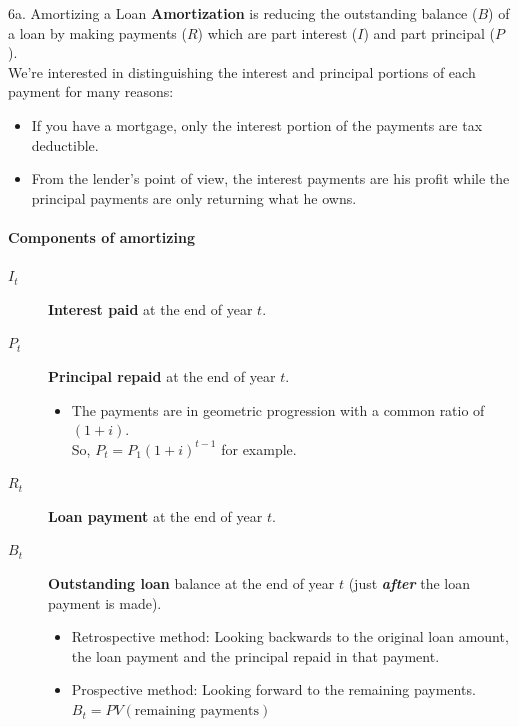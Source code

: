 \begin{CHPT_SUMM_AUTO}[label = {L.-6a}]{6a. Amortizing a Loan}
\textbf{Amortization} is reducing the outstanding balance ($B$) of a loan by making payments ($R$) which are part interest ($I$) and part principal ($P$).\\

We're interested in distinguishing the interest and principal portions of each payment for many reasons:
\begin{itemize}[leftmargin = *]
	\item	If you have a mortgage, only the interest portion of the payments are tax deductible. 
	\item	From the lender's point of view, the interest payments are his profit while the principal payments are only returning what he owns.
\end{itemize}

\paragraph{Components of amortizing}
\begin{description}
	\item[$I_{t}$]	\textbf{Interest paid} at the end of year $t$.
	\item[$P_{t}$]	\textbf{Principal repaid} at the end of year $t$.
		\begin{itemize}[leftmargin = *]
		\item	The payments are in geometric progression with a common ratio of $(1 + i)$.\\
				So, $P_{t} = P_{1} (1 + i)^{t - 1}$ for example.
		\end{itemize}
	\item[$R_{t}$]	\textbf{Loan payment} at the end of year $t$.
	\item[$B_{t}$]	\textbf{Outstanding loan} balance at the end of year $t$ (just \textbf{\textit{after}} the loan payment is made).
		\begin{itemize}[leftmargin = *]
		\item	Retrospective method: Looking backwards to the original loan amount, the loan payment and the principal repaid in that payment.
		\item	Prospective method: Looking forward to the remaining payments.\\
				$B_{t} = PV(\text{remaining payments})$
		\end{itemize}
\end{description}


\end{CHPT_SUMM_AUTO}
